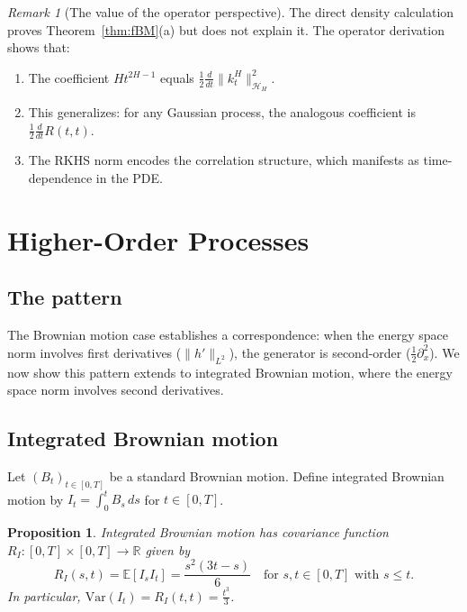 \documentclass[12pt]{article}
\theoremstyle{plain}
\newtheorem{proposition}[theorem]{Proposition}
\theoremstyle{definition}
\theoremstyle{remark}
\newtheorem{remark}[theorem]{Remark}
\newcommand{\E}{\mathbb{E}}
\newcommand{\R}{\mathbb{R}}
\newcommand{\HH}{\mathcal{H}}
\begin{document}
\begin{remark}[The value of the operator perspective]\label{rmk:fBM-value}
The direct density calculation proves Theorem~\ref{thm:fBM}(a) but does not explain it. The operator derivation shows that:
\begin{enumerate}[label=(\arabic*)]
\item The coefficient $Ht^{2H-1}$ equals $\frac{1}{2}\frac{d}{dt}\|k_t^H\|_{\HH_H}^2$.
\item This generalizes: for any Gaussian process, the analogous coefficient is $\frac{1}{2}\frac{d}{dt}R(t,t)$.
\item The RKHS norm encodes the correlation structure, which manifests as time-dependence in the PDE.
\end{enumerate}
\end{remark}

\section{Higher-Order Processes}\label{sec:higher-order}

\subsection{The pattern}

The Brownian motion case establishes a correspondence: when the energy space norm involves first derivatives ($\|h'\|_{L^2}$), the generator is second-order ($\frac{1}{2}\partial_x^2$). We now show this pattern extends to integrated Brownian motion, where the energy space norm involves second derivatives.

\subsection{Integrated Brownian motion}

Let $(B_t)_{t \in [0,T]}$ be a standard Brownian motion. Define integrated Brownian motion by $I_t = \int_0^t B_s \, ds$ for $t \in [0,T]$.

\begin{proposition}\label{prop:IBM-covariance}
Integrated Brownian motion has covariance function $R_I: [0,T] \times [0,T] \to \R$ given by
\begin{equation}\label{eq:IBM-covariance}
R_I(s,t) = \E[I_s I_t] = \frac{s^2(3t-s)}{6} \quad \text{for } s, t \in [0,T] \text{ with } s \leq t.
\end{equation}
In particular, $\mathrm{Var}(I_t) = R_I(t,t) = \frac{t^3}{3}$.
\end{proposition}
\end{document}
